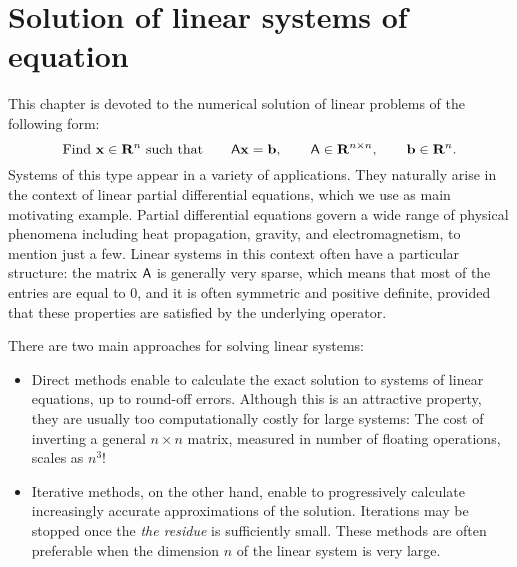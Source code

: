 \chapter{Solution of linear systems of equation}
\label{cha:solution_of_linear_systems}
This chapter is devoted to the numerical solution of linear problems of the following form:
\begin{equation}
    \label{eq:linear_system}
    \text{Find $\mathbf x \in \mathbf R^n$ such that} \qquad
    \mathsf A \mathbf x = \mathbf b,
    \qquad \mathsf A \in \mathbf R^{n \times n},
    \qquad \mathbf b \in \mathbf R^n.
\end{equation}
Systems of this type appear in a variety of applications.
They naturally arise in the context of linear partial differential equations,
which we use as main motivating example.
Partial differential equations govern a wide range of physical phenomena including heat propagation, gravity, and electromagnetism,
to mention just a few.
Linear systems in this context often have a particular structure:
the matrix $\mathsf A$ is generally very sparse,
which means that most of the entries are equal to 0,
and it is often symmetric and positive definite,
provided that these properties are satisfied by the underlying operator.

There are two main approaches for solving linear systems:
\begin{itemize}
    \item
        Direct methods enable to calculate the exact solution to systems of linear equations,
        up to round-off errors.
        Although this is an attractive property,
        they are usually too computationally costly for large systems:
        The cost of inverting a general $n \times n$ matrix,
        measured in number of floating operations,
        scales as $n^3$!

    \item
        Iterative methods, on the other hand,
        enable to progressively calculate increasingly accurate approximations of the solution.
        Iterations may be stopped once the \emph{the residue} is sufficiently small.
        These methods are often preferable when the dimension $n$ of the linear system is very large.
\end{itemize}


